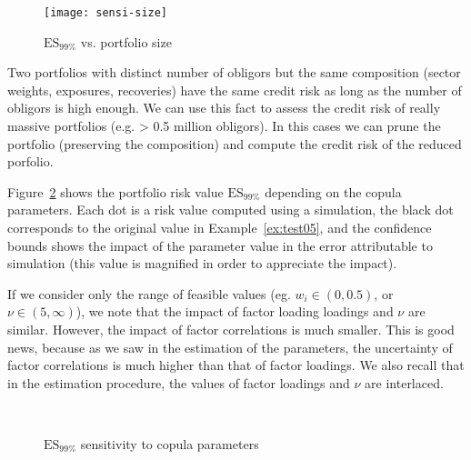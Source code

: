 \documentclass[11pt,fleqn]{book} %
\begin{document}
\begin{figure}[!ht]
	\centering
	\texttt{[image: sensi-size]}
	\caption{$\text{ES}_{99\%}$ vs. portfolio size}
	\label{fig:sensi1}
\end{figure}

Two portfolios with distinct number of obligors but the same composition 
(sector weights, exposures, recoveries) have the same credit risk as long as 
the number of obligors is high enough. We can use this fact to assess the 
credit risk of really massive portfolios (e.g. > 0.5 million obligors). In 
this cases we can prune the portfolio (preserving the composition) and compute 
the credit risk of the reduced porfolio.

\begin{example}
	Figure~\ref{fig:sensi2} shows the portfolio risk value $\text{ES}_{99\%}$ 
	depending on the copula parameters. Each dot is a 
	risk value computed using a simulation, the black dot corresponds to the 
	original value in Example~\ref{ex:test05}, and the confidence bounds shows 
	the impact of the parameter value in the error attributable to simulation 
	(this value is magnified in order to appreciate the impact).
	
	If we consider only the range of feasible values (eg. $w_i \in (0,0.5)$, or
	$\nu \in (5,\infty)$), we note that the impact of factor loading loadings
	and $\nu$ are similar. However, the impact of factor correlations is much 
	smaller. This is good news, because as we saw in the estimation of the 
	parameters, the uncertainty of factor correlations is much higher than 
	that of factor loadings. We also recall that in the estimation procedure,
	the values of factor loadings and $\nu$ are interlaced. 
\end{example}

\begin{figure}[!ht]
	\centering
	\\
	\caption{$\text{ES}_{99\%}$ sensitivity to copula parameters}
	\label{fig:sensi2}
\end{figure}
\end{document}
